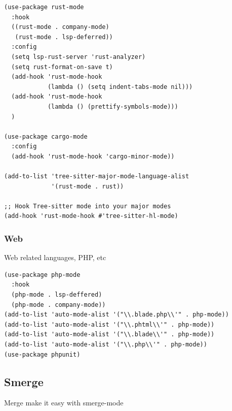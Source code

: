 \documentclass[11pt]{article}
\begin{document}
\begin{verbatim}
(use-package rust-mode
  :hook
  ((rust-mode . company-mode)
   (rust-mode . lsp-deferred))
  :config
  (setq lsp-rust-server 'rust-analyzer)
  (setq rust-format-on-save t)
  (add-hook 'rust-mode-hook
            (lambda () (setq indent-tabs-mode nil)))
  (add-hook 'rust-mode-hook
            (lambda () (prettify-symbols-mode)))
  )

(use-package cargo-mode
  :config
  (add-hook 'rust-mode-hook 'cargo-minor-mode))

(add-to-list 'tree-sitter-major-mode-language-alist
             '(rust-mode . rust))

;; Hook Tree-sitter mode into your major modes
(add-hook 'rust-mode-hook #'tree-sitter-hl-mode)
\end{verbatim}

\subsubsection{Web}
\label{sec:org1bbdea5}
Web related languages, PHP, etc

\begin{verbatim}
(use-package php-mode
  :hook
  (php-mode . lsp-deffered)
  (php-mode . company-mode))
(add-to-list 'auto-mode-alist '("\\.blade.php\\'" . php-mode))
(add-to-list 'auto-mode-alist '("\\.phtml\\'" . php-mode))
(add-to-list 'auto-mode-alist '("\\.blade\\'" . php-mode))
(add-to-list 'auto-mode-alist '("\\.php\\'" . php-mode))
(use-package phpunit)

\end{verbatim}

\subsection{Smerge}
\label{sec:orgaf1ae1a}

Merge make it easy with smerge-mode
\end{document}
